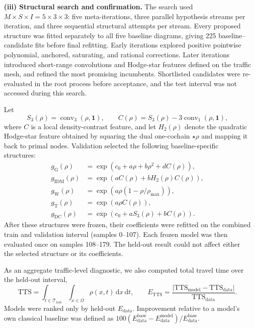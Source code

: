 \noindent\textbf{(iii) Structural search and confirmation.}
The search used $M\times S\times I=5\times3\times3$: five meta-iterations,
three parallel hypothesis streams per iteration, and three sequential
structural attempts per stream. Every proposed structure was fitted separately
to all five baseline diagrams, giving 225 baseline--candidate fits before final
refitting. Early iterations explored positive pointwise polynomial, anchored,
saturating, and rational corrections. Later iterations introduced short-range
convolutions and Hodge-star features defined on the traffic mesh, and refined
the most promising incumbents. Shortlisted candidates were re-evaluated in the
root process before acceptance, and the test interval was not accessed during
this search.

Let
\begin{equation}
    S_3(\rho)=\operatorname{conv}_3(\rho,\mathbf{1}),
    \qquad
    C(\rho)=S_3(\rho)-3\operatorname{conv}_1(\rho,\mathbf{1}),
\end{equation}
where $C$ is a local density-contrast feature, and let $H_2(\rho)$ denote the
quadratic Hodge-star feature obtained by squaring the dual one-cochain
$\star\rho$ and mapping it back to primal nodes. Validation selected the
following baseline-specific structures:
\begin{align}
    g_{\mathrm{G}}(\rho)
        &= \exp\!\left(c_0+a\rho+b\rho^2+dC(\rho)\right), \\
    g_{\mathrm{IDM}}(\rho)
        &= \exp\!\left(aC(\rho)+bH_2(\rho)C(\rho)\right), \\
    g_{\mathrm{W}}(\rho)
        &= \exp\!\left(a\rho\left(1-\rho/\rho_{\max}\right)\right), \\
    g_{\mathrm{T}}(\rho)
        &= \exp\!\left(a\rho C(\rho)\right), \\
    g_{\mathrm{DC}}(\rho)
        &= \exp\!\left(c_0+aS_3(\rho)+bC(\rho)\right).
    \label{eq:traffic-selected-corrections}
\end{align}
After these structures were frozen, their coefficients were refitted on the
combined train and validation interval (samples 0--107). Each frozen model was
then evaluated once on samples 108--179. The held-out result could not affect
either the selected structure or its coefficients.

As an aggregate traffic-level diagnostic, we also computed total travel time
over the held-out interval,
\begin{equation}
    \mathrm{TTS}=\int_{t\in\mathcal{T}_{\mathrm{test}}}
                 \int_{x\in\Omega}\rho(x,t)\,\mathrm{d}x\,\mathrm{d}t,
    \qquad
    E_{\mathrm{TTS}}
      =\frac{|\mathrm{TTS}_{\mathrm{model}}-\mathrm{TTS}_{\mathrm{data}}|}
             {\mathrm{TTS}_{\mathrm{data}}}.
    \label{eq:traffic-tts}
\end{equation}
Models were ranked only by held-out $E_{\mathrm{data}}$. Improvement relative
to a model's own classical baseline was defined as
$100(E_{\mathrm{data}}^{\mathrm{base}}-E_{\mathrm{data}}^{\mathrm{model}})
/E_{\mathrm{data}}^{\mathrm{base}}$.

